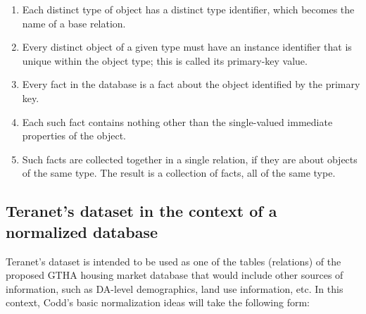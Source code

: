 \begin{enumerate}
    \item Each distinct type of object has a distinct type identifier, which becomes the name of a base relation.
    \item Every distinct object of a given type must have an instance identifier that is unique within the object type;
    this is called its primary-key value.
    \item Every fact in the database is a fact about the object identified by the primary key.
    \item Each such fact contains nothing other than the single-valued immediate properties of the object.
    \item Such facts are collected together in a single relation, if they are about objects of the same type.
    The result is a collection of facts, all of the same type.
\end{enumerate}

\subsection{Teranet's dataset in the context of a normalized database} \label{subsec:teranet_db_norm}

Teranet's dataset is intended to be used as one of the tables (relations) of the proposed GTHA housing market database that would include other sources of information, such as DA-level demographics, land use information, etc.
In this context, Codd's basic normalization ideas will take the following form:


